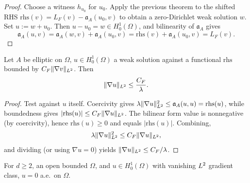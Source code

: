 \begin{proof}
\leanok
{}

Choose a witness $h_{u_0}$ for $u_0$. Apply the previous theorem to the shifted RHS $\mathrm{rhs}(v) = L_F(v) - \mathfrak{a}_A(u_0, v)$ to obtain a zero-Dirichlet weak solution $w$. Set $u := w + u_0$. Then $u - u_0 = w \in H^{1}_{0}(\Omega)$, and bilinearity of $\mathfrak{a}_A$ gives
\begin{equation*}
  \mathfrak{a}_A(u, v) = \mathfrak{a}_A(w, v) + \mathfrak{a}_A(u_0, v) = \mathrm{rhs}(v) + \mathfrak{a}_A(u_0, v) = L_F(v).
\end{equation*}
\end{proof}

\begin{theorem}
\label{thm:weakSolution_stability}
\leanok
{}
Let $A$ be elliptic on $\Omega$, $u \in H^{1}_{0}(\Omega)$ a weak solution against a functional $\mathrm{rhs}$ bounded by $C_F\|\nabla v\|_{L^{2}}$. Then
\begin{equation*}
  \|\nabla u\|_{L^{2}} \leq \frac{C_F}{\lambda}.
\end{equation*}
\end{theorem}

\begin{proof}
\leanok
{}

Test against $u$ itself. Coercivity gives $\lambda \|\nabla u\|_{L^{2}}^{2} \leq \mathfrak{a}_A(u, u) = \mathrm{rhs}(u)$, while boundedness gives $|\mathrm{rhs}(u)| \leq C_F \|\nabla u\|_{L^{2}}$. The bilinear form value is nonnegative (by coercivity), hence $\mathrm{rhs}(u) \geq 0$ and equals $|\mathrm{rhs}(u)|$. Combining,
\begin{equation*}
  \lambda \|\nabla u\|_{L^{2}}^{2} \leq C_F \|\nabla u\|_{L^{2}},
\end{equation*}
and dividing (or using $\nabla u = 0$) yields $\|\nabla u\|_{L^{2}} \leq C_F/\lambda$.
\end{proof}

\begin{theorem}
\label{thm:ae_eq_zero_of_memH01_of_gradLpOfWitness_eq_zero}
\leanok
{}
For $d \geq 2$, an open bounded $\Omega$, and $u \in H^{1}_{0}(\Omega)$ with vanishing $L^{2}$ gradient class, $u = 0$ a.e.\ on $\Omega$.
\end{theorem}

